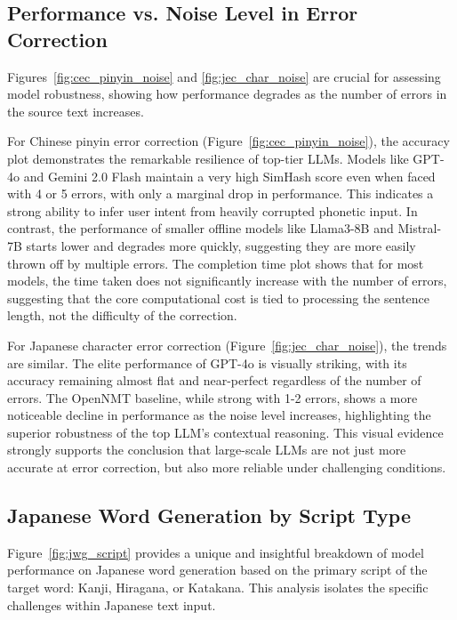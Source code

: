 \documentclass[10pt, a4paper]{article}
\begin{document}
\subsection{Performance vs. Noise Level in Error Correction}

Figures~\ref{fig:cec_pinyin_noise} and \ref{fig:jec_char_noise} are crucial for assessing model robustness, showing how performance degrades as the number of errors in the source text increases.

For Chinese pinyin error correction (Figure~\ref{fig:cec_pinyin_noise}), the accuracy plot demonstrates the remarkable resilience of top-tier LLMs. Models like GPT-4o and Gemini 2.0 Flash maintain a very high SimHash score even when faced with 4 or 5 errors, with only a marginal drop in performance. This indicates a strong ability to infer user intent from heavily corrupted phonetic input. In contrast, the performance of smaller offline models like Llama3-8B and Mistral-7B starts lower and degrades more quickly, suggesting they are more easily thrown off by multiple errors. The completion time plot shows that for most models, the time taken does not significantly increase with the number of errors, suggesting that the core computational cost is tied to processing the sentence length, not the difficulty of the correction.

For Japanese character error correction (Figure~\ref{fig:jec_char_noise}), the trends are similar. The elite performance of GPT-4o is visually striking, with its accuracy remaining almost flat and near-perfect regardless of the number of errors. The {OpenNMT} baseline, while strong with 1-2 errors, shows a more noticeable decline in performance as the noise level increases, highlighting the superior robustness of the top LLM's contextual reasoning. This visual evidence strongly supports the conclusion that large-scale LLMs are not just more accurate at error correction, but also more reliable under challenging conditions.

\subsection{Japanese Word Generation by Script Type}

Figure~\ref{fig:jwg_script} provides a unique and insightful breakdown of model performance on Japanese word generation based on the primary script of the target word: Kanji, Hiragana, or Katakana. This analysis isolates the specific challenges within Japanese text input.
\end{document}
